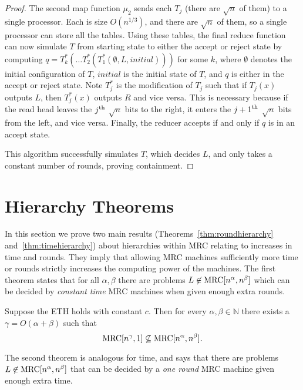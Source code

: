 \begin{proof}
The second map function $\mu_2$ sends each $T_j$ (there are $\sqrt{n}$ of them)
to a single processor. Each is size $O(n^{1/3})$, and there are $\sqrt{n}$ of
them, so a single processor can store all the tables. Using these tables, the
final reduce function can now simulate $T$ from starting state to either the
accept or reject state by computing $q=T_k^*(\ldots
T_2^*(T_1^*(\emptyset,L,initial)))$ for some $k$, where $\emptyset$ denotes the
initial configuration of $T$, $initial$ is the initial state of $T$, and $q$ is
either in the accept or reject state. Note $T_j^*$ is the modification of $T_j$
such that if $T_j(x)$ outputs $L$, then $T_j^*(x)$ outputs $R$ and vice versa.
This is necessary because if the read head leaves the $j^\textup{th}$
$\sqrt{n}$ bits to the right, it enters the ${j+1}^\textup{th}$ $\sqrt{n}$ bits
from the left, and vice versa. Finally, the reducer accepts if and only if $q$ is in an
accept state.

This algorithm successfully simulates $T$, which decides $L$, and only takes a
constant number of rounds, proving containment. \end{proof}

\section{Hierarchy Theorems}\label{sec:hierarchy}

In this section we prove two main results (Theorems~\ref{thm:roundhierarchy}
and~\ref{thm:timehierarchy}) about hierarchies within MRC relating to increases
in time and rounds.  They imply that allowing MRC machines sufficiently more
time or rounds strictly increases the computing power of the machines.  The
first theorem states that for all $\alpha, \beta$ there are problems $L \not
\in \textup{MRC}[n^\alpha, n^\beta]$ which can be decided by \emph{constant time} MRC
machines when given enough extra rounds.

\begin{theorem} \label{thm:roundhierarchy}
Suppose the ETH holds with constant $c$. Then for every $\alpha,\beta\in\mathbb N$
there exists a $\gamma = O(\alpha + \beta)$ such that $$\textup{MRC}[n^\gamma,1]
\not\subseteq \textup{MRC}[n^\alpha, n^\beta].$$
\end{theorem}

The second theorem is analogous for time, and says that there are problems $L
\not \in \textup{MRC}[n^\alpha, n^\beta]$ that can be decided by a \emph{one round} MRC
machine given enough extra time.


